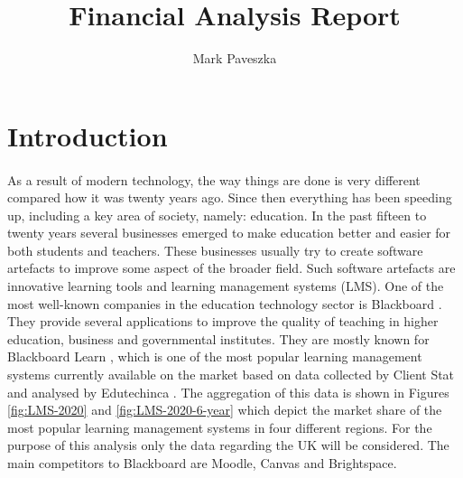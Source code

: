 \documentclass[]{article}
\title{Financial Analysis Report}
\author{Mark Paveszka}
\begin{document}
\maketitle

\newpage

\begin{abstract}
\end{abstract}

\newpage

\tableofcontents

\newpage

\section{Introduction}
\paragraph{}
As a result of modern technology, the way things are done is very different compared how it was twenty years ago. Since then everything has been speeding up, including a key area of society, namely: education. In the past fifteen to twenty years several businesses emerged to make education better and easier for both students and teachers. These businesses usually try to create software artefacts to improve some aspect of the broader field. Such software artefacts are innovative learning tools and learning management systems (LMS). One of the most well-known companies in the education technology sector is Blackboard \cite{Blackboard_UK}. They provide several applications to improve the quality of teaching in higher education, business and governmental institutes. They are mostly known for Blackboard Learn \cite{Blackboard_Learn}, which is one of the most popular learning management systems currently available on the market based on data collected by Client Stat \cite{VLE-Data} and analysed by Edutechinca \cite{VLE-2020-IMG}. The aggregation of this data is shown in Figures \ref{fig:LMS-2020} and \ref{fig:LMS-2020-6-year} which depict the market share of the most popular learning management systems in four different regions. For the purpose of this analysis only the data regarding the UK will be considered. The main competitors to Blackboard are Moodle, Canvas and Brightspace. 
\end{document}
